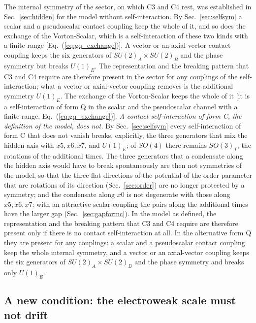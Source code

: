 The internal symmetry of the sector, on which C3 and C4 rest, was established in
Sec.~\ref{sec:hidden} for the model without self-interaction.
By Sec.~\ref{sec:selfsym} a scalar
and a pseudoscalar contact coupling keep the whole of it, and so does the exchange of the
Vorton-Scalar, which is a self-interaction of these two kinds with a finite range
[Eq.~(\ref{eq:gq_exchange})]. A vector or an axial-vector contact coupling keeps the six generators
of $SU(2)_A\times SU(2)_B$ and the phase symmetry but breaks $U(1)_E$. The representation and the
breaking pattern that C3 and C4 require are therefore present in the sector for any couplings of the
self-interaction; what a vector or axial-vector coupling removes is the additional symmetry
$U(1)_E$.
The exchange of the Vorton-Scalar keeps the whole of it [it is a self-interaction of form Q in the
scalar and the pseudoscalar channel with a finite range, Eq.~(\ref{eq:gq_exchange})]. \emph{A contact
self-interaction of form C, the definition of the model, does not.} By Sec.~\ref{sec:selfsym} every
self-interaction of form C that does not vanish breaks, explicitly, the three generators that mix
the hidden axis with $x5,x6,x7$, and $U(1)_E$; of $SO(4)$ there remains $SO(3)_T$, the rotations of
the additional times. The three generators that a condensate along the hidden axis would have to
break spontaneously are then not symmetries of the model, so that the three flat directions of the
potential of the order parameter that are rotations of its direction (Sec.~\ref{sec:order}) are no
longer protected by a symmetry; and the condensate along $x0$ is not degenerate with those along
$x5,x6,x7$:
with an attractive scalar coupling the pairs along the additional times have the larger gap
(Sec.~\ref{sec:gapformc}). In the model as defined, the representation and the breaking pattern that
C3 and C4 require are therefore present only if there is no contact self-interaction at all. In the
alternative form Q they are present for any couplings: a scalar and a pseudoscalar contact coupling
keep the whole internal symmetry, and a vector or an axial-vector coupling keeps the six generators
of $SU(2)_A\times SU(2)_B$ and the phase symmetry and breaks only $U(1)_E$.

\subsection{A new condition: the electroweak scale must not drift}

